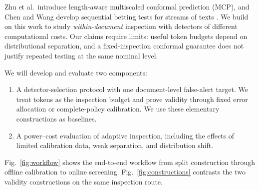 \documentclass[pdflatex,sn-mathphys-num]{sn-jnl}
\begin{document}
Zhu et al.\ introduce length-aware multiscaled conformal prediction (MCP), and Chen and Wang develop sequential betting tests for streams of texts \citep{zhu2025,chen2025}. We build on this work to study \emph{within-document} inspection with detectors of different computational costs. Our claims require limits: useful token budgets depend on distributional separation, and a fixed-inspection conformal guarantee does not justify repeated testing at the same nominal level.

We will develop and evaluate two components:
\begin{enumerate}
\item A detector-selection protocol with one document-level false-alert target. We treat tokens as the inspection budget and prove validity through fixed error allocation or complete-policy calibration. We use these elementary constructions as baselines.
\item A power--cost evaluation of adaptive inspection, including the effects of limited calibration data, weak separation, and distribution shift.
\end{enumerate}

Fig.~\ref{fig:workflow} shows the end-to-end workflow from split construction through offline calibration to online screening. Fig.~\ref{fig:constructions} contrasts the two validity constructions on the same inspection route.
\end{document}
